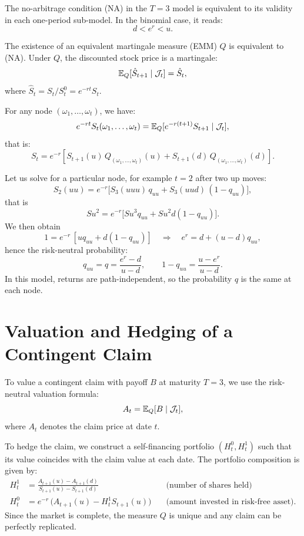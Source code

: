The no-arbitrage condition (NA) in the $T=3$ model is equivalent to its validity in each one-period sub-model.  
In the binomial case, it reads:
\begin{equation}
d < e^r < u.
\end{equation}

The existence of an equivalent martingale measure (EMM) $Q$ is equivalent to (NA).  
Under $Q$, the discounted stock price is a martingale:
\begin{equation}
\mathbb{E}_Q[\hat{S}_{t+1} \mid \mathcal{J}_t] = \hat{S}_t,
\end{equation}
where $\hat{S}_t = S_t / S_t^0 = e^{-rt} S_t$.

For any node $(\omega_1, \dots, \omega_t)$, we have:
\[
e^{-rt} S_t(\omega_1, \dots, \omega_t)
= \mathbb{E}_Q[e^{-r(t+1)} S_{t+1} \mid \mathcal{J}_t],
\]
that is:
\[
S_t = e^{-r} \left[ S_{t+1}(u)\, Q_{(\omega_1,\dots,\omega_t)}(u)
+ S_{t+1}(d)\, Q_{(\omega_1,\dots,\omega_t)}(d) \right].
\]

Let us solve for a particular node, for example $t=2$ after two up moves:
\[
S_2(uu) = e^{-r} \big[S_3(uuu)\, q_{uu} + S_3(uud)\,(1-q_{uu})\big],
\]
that is
\[
S u^2 = e^{-r} \big[S u^3 q_{uu} + S u^2 d (1-q_{uu})\big].
\]
We then obtain
\[
1 = e^{-r}\,[u q_{uu} + d(1-q_{uu})]
\quad\Rightarrow\quad
e^r = d + (u-d) q_{uu},
\]
hence the risk-neutral probability:
\[
q_{uu} = q = \frac{e^r - d}{u - d}, \qquad
1-q_{uu} = \frac{u - e^r}{u - d}.
\]
In this model, returns are path-independent, so the probability $q$ is the same at each node.

\section{Valuation and Hedging of a Contingent Claim}

To value a contingent claim with payoff $B$ at maturity $T=3$, we use the risk-neutral valuation formula:
\begin{equation}
A_t = \mathbb{E}_Q[B \mid \mathcal{J}_t],
\end{equation}
where $A_t$ denotes the claim price at date $t$.

To hedge the claim, we construct a self-financing portfolio $(H_t^0,H_t^1)$ such that its value coincides with the claim value at each date.  
The portfolio composition is given by:
\begin{align}
H_t^1 &= \frac{A_{t+1}(u) - A_{t+1}(d)}{S_{t+1}(u) - S_{t+1}(d)}
\quad &\text{(number of shares held)}\\
H_t^0 &= e^{-r}\,\big(A_{t+1}(u) - H_t^1 S_{t+1}(u)\big)
\quad &\text{(amount invested in risk-free asset).}
\end{align}
Since the market is complete, the measure $Q$ is unique and any claim can be perfectly replicated.

